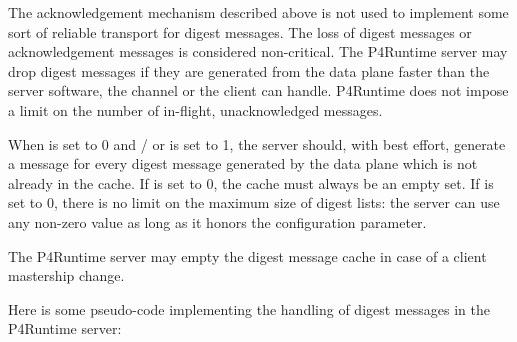 \documentclass[11pt]{article}
\begin{document}
{%
The acknowledgement mechanism described above is not used to implement some sort
of reliable transport for digest messages. The loss of digest messages or
acknowledgement messages is considered non-critical. The P4Runtime server may
drop digest messages if they are generated from the data plane faster than the
server software, the channel or the client can handle. P4Runtime does not impose
a limit on the number of in-flight, unacknowledged  messages.%

When  is set to 0 and / or  is set to 1, the
server should, with best effort, generate a  message for every
digest message generated by the data plane which is not already in the cache. If
 is set to 0, the cache must always be an empty set. If
 is set to 0, there is no limit on the maximum size of digest
lists: the server can use any non-zero value as long as it honors the
 configuration parameter.%

The P4Runtime server may empty the digest message cache in case of a client
mastership change.%

Here is some pseudo-code implementing the handling of digest messages in the
P4Runtime server:%

}
\end{document}
